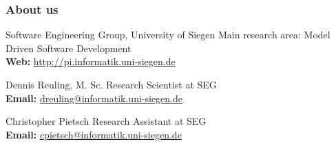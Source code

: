 \begingroup
\makeatletter
{}
\makeatother
\begin{frame}
\frametitle{About us}
\begin{block}{Software Engineering Group, University of Siegen}
Main research area: Model Driven Software Development \\
\medskip
\textbf{Web:} \url{http://pi.informatik.uni-siegen.de}
\end{block}
\begin{block}{Dennis Reuling, M. Sc.}
Research Scientist at SEG\\
\medskip
\textbf{Email:} \url{dreuling@informatik.uni-siegen.de}

\end{block}
\begin{block}{Christopher Pietsch}
Research Assistant at SEG \\
\medskip
\textbf{Email:} \url{cpietsch@informatik.uni-siegen.de}
\end{block}
\end{frame}
\endgroup
